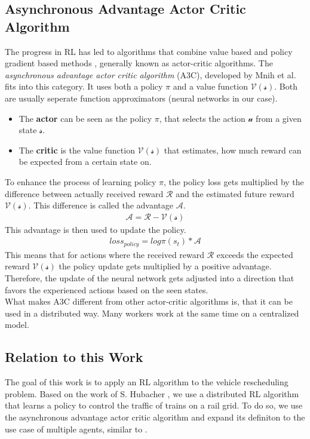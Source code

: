 \subsection*{Asynchronous Advantage Actor Critic Algorithm}\label{a3c_intro}
The progress in RL has led to algorithms that combine value based and policy gradient based methods , generally known as actor-critic algorithms. The \textit{asynchronous advantage actor critic algorithm} (A3C), developed by Mnih et al. \cite{a3c} fits into this category. It uses both a policy $\pi$ and a value function $\mathcal{V(s)}$.
Both are usually seperate function approximators (neural networks in our case).
\begin{itemize}
	\item The \textbf{actor} can be seen as the policy $\pi$, that selects the action $\mathcal{u}$ from a given state $\mathcal{s}$.
	\item The \textbf{critic} is the value function $\mathcal{V(s)}$ that estimates, how much reward can be expected from a certain state on.
\end{itemize}
To enhance the process of learning policy $\pi$, the policy loss gets multiplied by the difference between actually received reward $\mathcal{R}$ and the estimated future reward $\mathcal{V(s)}$. This difference is called the advantage $\mathcal{A}$.
\begin{gather*}
\mathcal{A}=\mathcal{R}-\mathcal{V(s)}
\end{gather*}
This advantage is then used to update the policy.
\begin{gather*}
loss_{policy}=log \pi(s_{t})*\mathcal{A}
\end{gather*}
This means that for actions where the received reward $\mathcal{R}$ exceeds the expected reward $\mathcal{V(s)}$ the policy update gets multiplied by a positive advantage. Therefore, the update of the neural network gets adjusted into a direction that favors the experienced actions based on the seen states.\\
What makes A3C different from other actor-critic algorithms is, that it can be used in a distributed way. Many workers work at the same time on a centralized model.
\subsection*{Relation to this Work}\label{rl_relation_work}
The goal of this work is to apply an RL algorithm to the vehicle rescheduling problem. Based on the work of S. Hubacher \cite{flatlandstephan}, we use a distributed RL algorithm that learns a policy to control the traffic of trains on a rail grid. To do so, we use the asynchronous advantage actor critic algorithm \cite{a3c} and expand its definiton to the use case of multiple agents, similar to \cite{marltraffica3c}.

